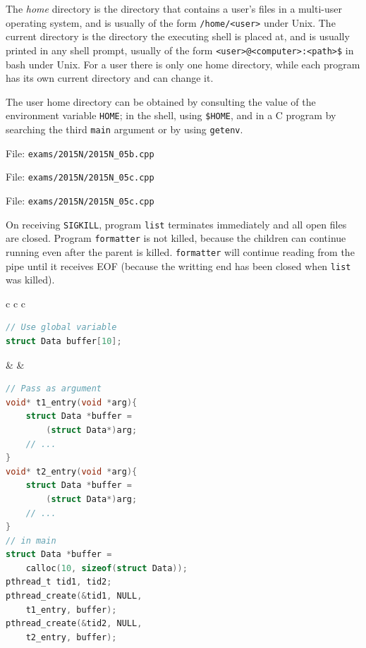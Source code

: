 \documentclass{sope}
\begin{document}
The \emph{home} directory is the directory that contains a user's files in a multi-user operating system, and is usually of the form \texttt{/home/<user>} under Unix. The current directory is the directory the executing shell is placed at, and is usually printed in any shell prompt, usually of the form \texttt{<user>@<computer>:<path>\$} in bash under Unix. For a user there is only one home directory, while each program has its own current directory and can change it.

The user home directory can be obtained by consulting the value of the environment variable \texttt{HOME}; in the shell, using \texttt{\$HOME}, and in a C program by searching the third \texttt{main} argument or by using \texttt{getenv}.


File: \texttt{exams/2015N/2015N\_05b.cpp}


File: \texttt{exams/2015N/2015N\_05c.cpp}


File: \texttt{exams/2015N/2015N\_05c.cpp}


On receiving \texttt{SIGKILL}, program \texttt{list} terminates immediately and all open files are closed. Program \texttt{formatter} is not killed, because the children can continue running even after the parent is killed. \texttt{formatter} will continue reading from the pipe until it receives EOF (because the writting end has been closed when \texttt{list} was killed).

\begin{center}
    \lstset{
        showlines=true
    }
    \begin{tabular}{c c c}
        \begin{minipage}[t]{67mm}\begin{lstlisting}[language=C]
// Use global variable
struct Data buffer[10];
        \end{lstlisting}\end{minipage} & &
        \begin{minipage}[t]{80mm}\begin{lstlisting}[language=C]
// Pass as argument
void* t1_entry(void *arg){
    struct Data *buffer =
        (struct Data*)arg;
    // ...
}
void* t2_entry(void *arg){
    struct Data *buffer =
        (struct Data*)arg;
    // ...
}
// in main
struct Data *buffer =
    calloc(10, sizeof(struct Data));
pthread_t tid1, tid2;
pthread_create(&tid1, NULL,
    t1_entry, buffer);
pthread_create(&tid2, NULL,
    t2_entry, buffer);
        \end{lstlisting}\end{minipage}
    \end{tabular}
\end{center}
\end{document}
